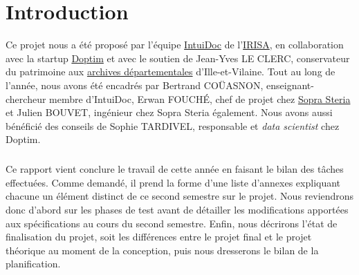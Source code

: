 \chapter{Introduction}
\pagestyle{fancy}
\fancyhf{}

Ce projet nous a été proposé par l’équipe \href{https://www-intuidoc.irisa.fr/}{IntuiDoc} de l’\href{https://www.irisa.fr/}{IRISA}, en collaboration avec la startup \href{http://www.doptim.eu}{Doptim} et avec le soutien de Jean-Yves LE CLERC, conservateur du patrimoine aux \href{http://archives.ille-et-vilaine.fr/fr}{archives départementales} d'Ille-et-Vilaine. Tout au long de l’année, nous avons été encadrés par Bertrand COÜASNON, enseignant-chercheur membre d'IntuiDoc, Erwan FOUCHÉ, chef de projet chez \href{https://www.soprasteria.com/fr}{Sopra Steria} et Julien BOUVET, ingénieur chez Sopra Steria également. Nous avons aussi bénéficié des conseils de Sophie TARDIVEL, responsable et \textit{data scientist} chez Doptim.

\paragraph{}
Ce rapport vient conclure le travail de cette année en faisant le bilan des tâches effectuées. Comme demandé, il prend la forme d'une liste d'annexes expliquant chacune un élément distinct de ce second semestre sur le projet. Nous reviendrons donc d'abord sur les phases de test avant de détailler les modifications apportées aux spécifications au cours du second semestre. Enfin, nous décrirons l'état de finalisation du projet, soit les différences entre le projet final et le projet théorique au moment de la conception, puis nous dresserons le bilan de la planification.